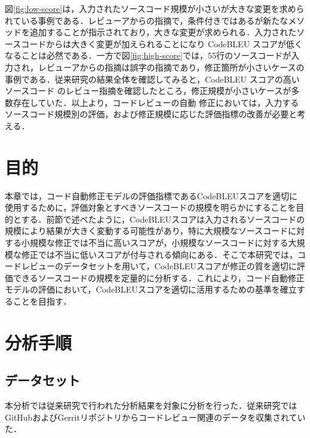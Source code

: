 \documentclass[11pt]{jreport}
\begin{document}
図\ref{fig:low-score}は，入力されたソースコード規模が小さいが大きな変更を求められている事例である．レビューアからの指摘で，条件付きではあるが新たなメソッドを追加することが指示されており，大きな変更が求められる．入力されたソースコードからは大きく変更が加えられることになり CodeBLEU スコアが低くなることは必然である．一方で図\ref{fig:high-score}では，55行のソースコードが入力され，レビューアからの指摘は誤字の指摘であり，修正箇所が小さいケースの事例である．従来研究の結果全体を確認してみると，CodeBLEU スコアの高いソースコード
のレビュー指摘を確認したところ，修正規模が小さいケースが多数存在していた．以上より，コードレビューの自動
修正においては，入力するソースコード規模別の評価，および修正規模に応じた評価指標の改善が必要と考える．

\section {目的}
本章では，コード自動修正モデルの評価指標であるCodeBLEUスコアを適切に使用するために，評価対象とすべきソースコードの規模を明らかにすることを目的とする．前節で述べたように，CodeBLEUスコアは入力されるソースコードの規模により結果が大きく変動する可能性があり，特に大規模なソースコードに対する小規模な修正では不当に高いスコアが，小規模なソースコードに対する大規模な修正では不当に低いスコアが付与される傾向にある．そこで本研究では，コードレビューのデータセットを用いて，CodeBLEUスコアが修正の質を適切に評価できるソースコードの規模を定量的に分析する．これにより，コード自動修正モデルの評価において，CodeBLEUスコアを適切に活用するための基準を確立することを目指す．

\section{分析手順}

\subsection {データセット}
本分析では従来研究で行われた分析結果を対象に分析を行った．従来研究ではGitHubおよびGerritリポジトリからコードレビュー関連のデータを収集されていた．
\end{document}
